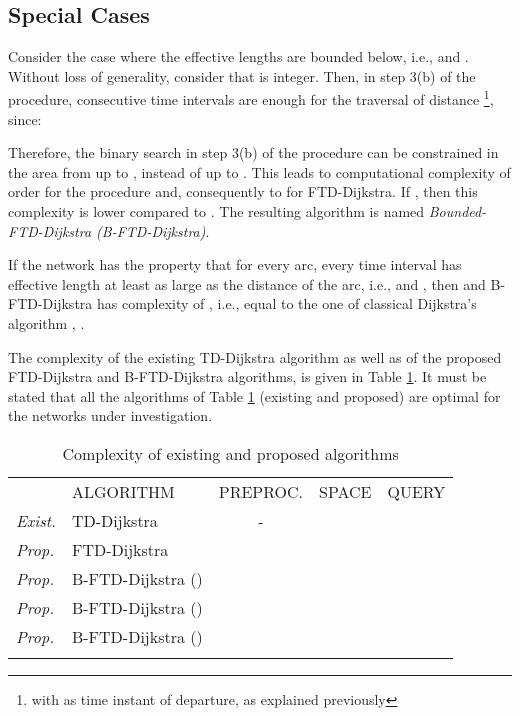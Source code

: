 \documentclass[conference]{IEEEtran}
\begin{document}
\subsection{Special Cases}

Consider the case where the effective lengths are bounded below, i.e.,   and . Without loss of generality, consider that  is integer. Then, in step 3(b) of the  procedure,  consecutive time intervals are enough for the traversal of distance \footnote{with  as time instant of departure, as explained previously}, since:



Therefore, the binary search in step 3(b) of the  procedure can be constrained in the area from  up to , instead of up to . This leads to computational complexity of order  for the  procedure and, consequently to   for FTD-Dijkstra. If , then this complexity is lower compared to . The resulting algorithm is named \emph{Bounded-FTD-Dijkstra (B-FTD-Dijkstra)}.

If the network has the property that for every arc, every time interval has effective length at least as large as the distance of the arc, i.e.,   and , then  and B-FTD-Dijkstra has complexity of , i.e., equal to the one of classical Dijkstra's algorithm \cite{dijkstra}, \cite{fibonacci}.

The complexity of the existing TD-Dijkstra algorithm as well as of the proposed FTD-Dijkstra and B-FTD-Dijkstra algorithms, is given in Table \ref{tab1}. It must be stated that all the algorithms of Table \ref{tab1} (existing and proposed) are optimal for the networks under investigation.

\begin{table}
\caption{Complexity of existing and proposed algorithms}
\label{tab1}
\begin{footnotesize}  
\begin{tabular}{llcll}
\hline\noalign{\smallskip}
 & ALGORITHM & PREPROC. & SPACE & QUERY  \\
\noalign{\smallskip}\hline\noalign{\smallskip}
\emph{Exist.} & TD-Dijkstra & - &  &  \\
\emph{Prop.} & FTD-Dijkstra &  &  &  \\
\emph{Prop.} & B-FTD-Dijkstra () &  &  &  \\
\emph{Prop.} & B-FTD-Dijkstra () &  &  &  \\
\emph{Prop.} & B-FTD-Dijkstra () &  &  &  \\
\noalign{\smallskip}\hline
\end{tabular}
\end{footnotesize}  
\end{table}
\end{document}
